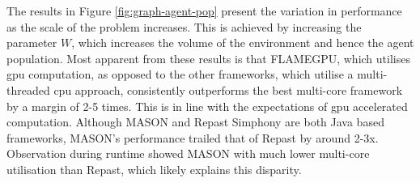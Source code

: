   The results in Figure \ref{fig:graph-agent-pop} present the variation in performance as the scale of the problem increases. This is achieved by increasing the parameter $W$, which increases the volume of the environment and hence the agent population. Most apparent from these results is that FLAMEGPU, which utilises \gls{gpu} computation, as opposed to the other frameworks, which utilise a multi-threaded \gls{cpu} approach, consistently outperforms the best multi-core framework by a margin of 2-5 times. This is in line with the expectations of \gls{gpu} accelerated computation\cite{LK*10}. Although MASON and Repast Simphony are both Java based frameworks, MASON's performance trailed that of Repast by around 2-3x. Observation during runtime showed MASON with much lower multi-core utilisation than Repast, which likely explains this disparity.
